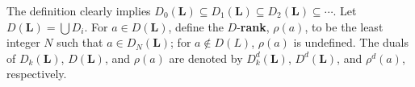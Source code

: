 The definition clearly implies 
$D_0(\mathbf L) \subseteq D_1(\mathbf L) \subseteq D_2(\mathbf L) \subseteq \cdots$.  
Let $D(\mathbf L) = \bigcup D_i$. For $a \in D(\mathbf L)$, define the $D$-\textbf{rank}, $\rho(a)$, 
to be the least integer $N$ such that $a \in D_N(\mathbf L)$; for $a \notin D(L)$, 
$\rho (a)$ is undefined. 
The duals of $D_k(\mathbf L)$, $D(\mathbf L)$, and $\rho(a)$ are denoted by $D^d_k(\mathbf L)$, 
$D^d(\mathbf L)$, and $\rho^d(a)$, respectively.


